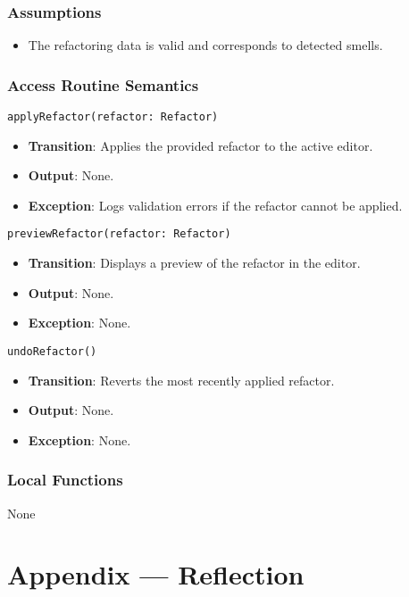\documentclass[12pt, titlepage]{article}
\begin{document}
\subsubsection{Assumptions}
\begin{itemize}
\item The refactoring data is valid and corresponds to detected smells.
\end{itemize}

\subsubsection{Access Routine Semantics}
\texttt{applyRefactor(refactor: Refactor)}
\begin{itemize}
\item \textbf{Transition}: Applies the provided refactor to the active editor.
\item \textbf{Output}: None.
\item \textbf{Exception}: Logs validation errors if the refactor cannot be applied.
\end{itemize}

\texttt{previewRefactor(refactor: Refactor)}
\begin{itemize}
\item \textbf{Transition}: Displays a preview of the refactor in the editor.
\item \textbf{Output}: None.
\item \textbf{Exception}: None.
\end{itemize}

\texttt{undoRefactor()}
\begin{itemize}
\item \textbf{Transition}: Reverts the most recently applied refactor.
\item \textbf{Output}: None.
\item \textbf{Exception}: None.
\end{itemize}

\subsubsection{Local Functions}
None


\newpage

\section{Appendix --- Reflection}
\end{document}
